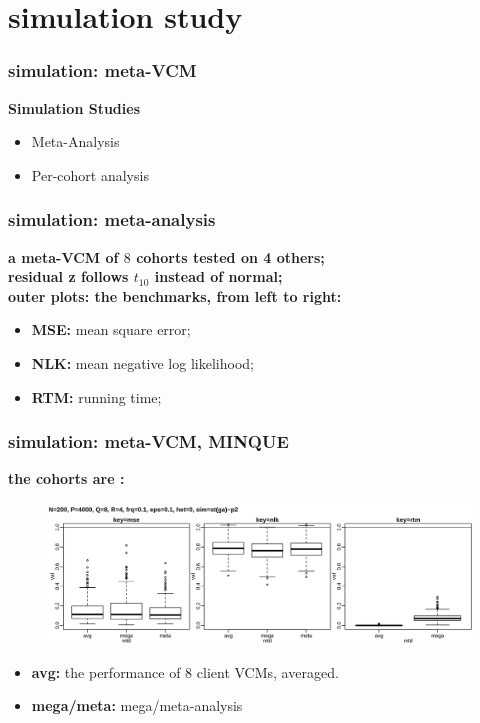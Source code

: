 \documentclass{beamer}
\begin{document}
\section{simulation study}
\begin{frame}\frametitle{simulation: meta-VCM}
  \centering
  \huge{\textbf{Simulation Studies}}
  \begin{itemize}
  \item Meta-Analysis
  \item Per-cohort analysis
  \end{itemize}
\end{frame}
\begin{frame}\frametitle{simulation: meta-analysis}
  \textbf{a meta-VCM of $8$ cohorts tested on 4 others;} \\
  \textbf{residual z follows $t_{10}$ instead of normal;} \\
  {\color{blue}\textbf{outer plots: the benchmarks, from left to right:}}
  \begin{itemize}
  \item \textbf{MSE:} mean square error;
  \item \textbf{NLK:} mean negative log likelihood;
  \item \textbf{RTM:} running time;
  \end{itemize}
\end{frame}
\begin{frame} \frametitle{simulation: meta-VCM, MINQUE}
  \textbf{the cohorts are \color{blue}{homogeneous}:} \\
  \begin{figure}
    \centering \includegraphics[width=.95\linewidth]{img/met_hom_stt_mnq_ssz}
  \end{figure}
  \textbf{\color{blue}{inner plot: strategies, from left to right:}}
  \begin{itemize}
  \item \textbf{avg:} the performance of 8 client VCMs, averaged.
  \item \textbf{mega/meta:} mega/meta-analysis
  \end{itemize}
\end{frame}
\end{document}
